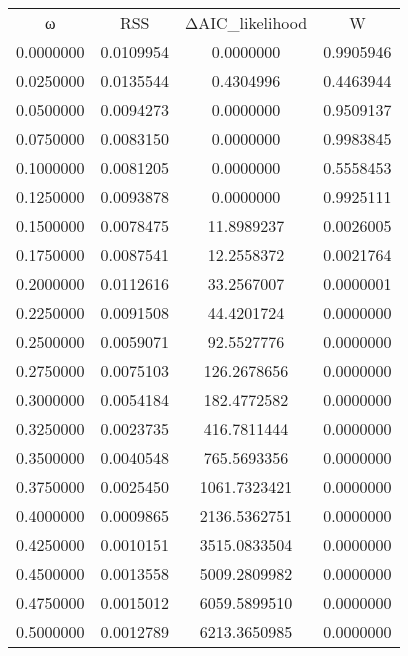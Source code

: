 \begin{tabular}{cccc}
ω & RSS & ΔAIC_likelihood & W\\
0.0000000 & 0.0109954 & 0.0000000 & 0.9905946\\
0.0250000 & 0.0135544 & 0.4304996 & 0.4463944\\
0.0500000 & 0.0094273 & 0.0000000 & 0.9509137\\
0.0750000 & 0.0083150 & 0.0000000 & 0.9983845\\
0.1000000 & 0.0081205 & 0.0000000 & 0.5558453\\
0.1250000 & 0.0093878 & 0.0000000 & 0.9925111\\
0.1500000 & 0.0078475 & 11.8989237 & 0.0026005\\
0.1750000 & 0.0087541 & 12.2558372 & 0.0021764\\
0.2000000 & 0.0112616 & 33.2567007 & 0.0000001\\
0.2250000 & 0.0091508 & 44.4201724 & 0.0000000\\
0.2500000 & 0.0059071 & 92.5527776 & 0.0000000\\
0.2750000 & 0.0075103 & 126.2678656 & 0.0000000\\
0.3000000 & 0.0054184 & 182.4772582 & 0.0000000\\
0.3250000 & 0.0023735 & 416.7811444 & 0.0000000\\
0.3500000 & 0.0040548 & 765.5693356 & 0.0000000\\
0.3750000 & 0.0025450 & 1061.7323421 & 0.0000000\\
0.4000000 & 0.0009865 & 2136.5362751 & 0.0000000\\
0.4250000 & 0.0010151 & 3515.0833504 & 0.0000000\\
0.4500000 & 0.0013558 & 5009.2809982 & 0.0000000\\
0.4750000 & 0.0015012 & 6059.5899510 & 0.0000000\\
0.5000000 & 0.0012789 & 6213.3650985 & 0.0000000\\
\end{tabular}
